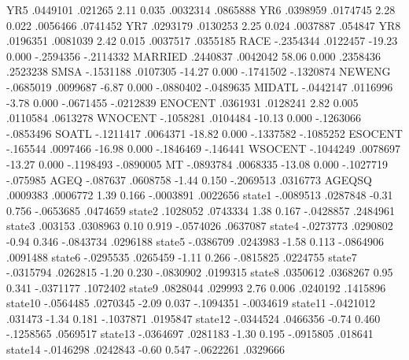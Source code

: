          YR5 {\VBAR}   .0449101    .021265     2.11   0.035     .0032314    .0865888
         YR6 {\VBAR}   .0398959   .0174745     2.28   0.022     .0056466    .0741452
         YR7 {\VBAR}   .0293179   .0130253     2.25   0.024     .0037887     .054847
         YR8 {\VBAR}   .0196351   .0081039     2.42   0.015     .0037517    .0355185
        RACE {\VBAR}  -.2354344   .0122457   -19.23   0.000    -.2594356   -.2114332
     MARRIED {\VBAR}   .2440837   .0042042    58.06   0.000     .2358436    .2523238
        SMSA {\VBAR}  -.1531188   .0107305   -14.27   0.000    -.1741502   -.1320874
      NEWENG {\VBAR}  -.0685019   .0099687    -6.87   0.000    -.0880402   -.0489635
      MIDATL {\VBAR}  -.0442147   .0116996    -3.78   0.000    -.0671455   -.0212839
     ENOCENT {\VBAR}   .0361931   .0128241     2.82   0.005     .0110584    .0613278
     WNOCENT {\VBAR}  -.1058281   .0104484   -10.13   0.000    -.1263066   -.0853496
       SOATL {\VBAR}  -.1211417   .0064371   -18.82   0.000    -.1337582   -.1085252
     ESOCENT {\VBAR}   -.165544   .0097466   -16.98   0.000    -.1846469    -.146441
     WSOCENT {\VBAR}  -.1044249   .0078697   -13.27   0.000    -.1198493   -.0890005
          MT {\VBAR}  -.0893784   .0068335   -13.08   0.000    -.1027719    -.075985
        AGEQ {\VBAR}   -.087637   .0608758    -1.44   0.150    -.2069513    .0316773
      AGEQSQ {\VBAR}   .0009383   .0006772     1.39   0.166    -.0003891    .0022656
      state1 {\VBAR}  -.0089513   .0287848    -0.31   0.756    -.0653685    .0474659
      state2 {\VBAR}   .1028052   .0743334     1.38   0.167    -.0428857    .2484961
      state3 {\VBAR}    .003153   .0308963     0.10   0.919    -.0574026    .0637087
      state4 {\VBAR}  -.0273773   .0290802    -0.94   0.346    -.0843734    .0296188
      state5 {\VBAR}  -.0386709   .0243983    -1.58   0.113    -.0864906    .0091488
      state6 {\VBAR}  -.0295535   .0265459    -1.11   0.266    -.0815825    .0224755
      state7 {\VBAR}  -.0315794   .0262815    -1.20   0.230    -.0830902    .0199315
      state8 {\VBAR}   .0350612   .0368267     0.95   0.341    -.0371177    .1072402
      state9 {\VBAR}   .0828044    .029993     2.76   0.006     .0240192    .1415896
     state10 {\VBAR}  -.0564485   .0270345    -2.09   0.037    -.1094351   -.0034619
     state11 {\VBAR}  -.0421012    .031473    -1.34   0.181    -.1037871    .0195847
     state12 {\VBAR}  -.0344524   .0466356    -0.74   0.460    -.1258565    .0569517
     state13 {\VBAR}  -.0364697   .0281183    -1.30   0.195    -.0915805     .018641
     state14 {\VBAR}  -.0146298   .0242843    -0.60   0.547    -.0622261    .0329666
